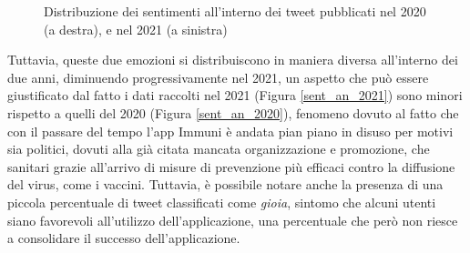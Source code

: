 \begin{figure}[H]
	\centering
	\quad
	\quad
	\setlength{\belowcaptionskip}{-10pt}
	\caption{Distribuzione dei sentimenti all'interno dei tweet pubblicati nel 2020 (a destra), e nel 2021 (a sinistra)}
	\label{fig: sentan}
\end{figure}
Tuttavia, queste due emozioni si distribuiscono in maniera diversa all'interno dei due anni, diminuendo progressivamente nel 2021, un aspetto che può essere giustificato dal fatto i dati raccolti nel 2021 (Figura \ref{sent_an_2021}) sono minori rispetto a quelli del 2020  (Figura \ref{sent_an_2020}), fenomeno dovuto al fatto che con il passare del tempo l'app Immuni è andata pian piano in disuso per motivi sia politici, dovuti alla già citata mancata organizzazione e promozione, che sanitari grazie all'arrivo di misure di prevenzione più efficaci contro la diffusione del virus, come i vaccini.
Tuttavia, è possibile notare anche la presenza di una piccola percentuale di tweet classificati come \textit{gioia}, sintomo che alcuni utenti siano favorevoli all'utilizzo dell'applicazione, una percentuale che però non riesce a consolidare il successo dell'applicazione.

